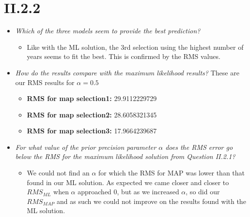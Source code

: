 \documentclass[12pt, a4paper]{article}
\begin{document}
\section{II.2.2}
\begin{itemize}
\item \textit{Which of the three models seem to provide
the best prediction?}
	\begin{itemize}
		\item Like with the ML solution, the 3rd selection using the highest number of years seems to fit the best. This is confirmed by the RMS values.
	\end{itemize}
\item \textit{How do the results compare with the maximum likelihood
results?}
	These are our RMS results for $\alpha = 0.5$
	\begin{itemize}
		\item \textbf{RMS for map selection1:} 29.9112229729
		\item \textbf{RMS for map selection2:} 28.6058321345
		\item \textbf{RMS for map selection3:} 17.9664239687
	\end{itemize}
\item \textit{For what value of the prior precision parameter $\alpha$ does the RMS error go below the RMS for the maximum likelihood solution from Question II.2.1?}
	\begin{itemize}
		\item We could not find an $\alpha$ for which the RMS for MAP was lower than that found in our ML solution. As expected we came closer and closer to $RMS_{ML}$ when $\alpha$ approached 0, but as we increased $\alpha$, so did our $RMS_{MAP}$ and as such we could not improve on the results found with the ML solution.
	\end{itemize}
\end{itemize}
\end{document}
